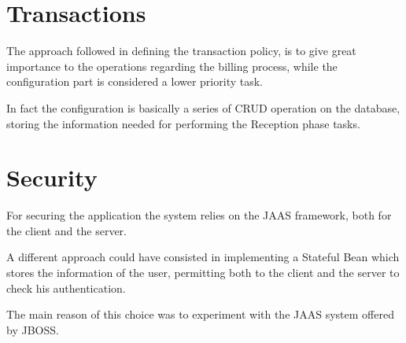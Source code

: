 \documentclass [11pt]{article}
\begin{document}
\section{Transactions}
The approach followed in defining the transaction policy, is to give great
importance to the operations regarding the billing process, while the
configuration part is considered a lower priority task.

In fact the configuration is basically a series of CRUD operation on the
database, storing the information needed for performing the Reception phase tasks.

\section{Security}
For securing the application the system relies on the JAAS framework, both
for the client and the server.

A different approach could have consisted in implementing a Stateful Bean which stores
the information of the user, permitting both to the client and the server
to check his authentication.

The main reason of this choice was to experiment with the JAAS system
offered by JBOSS.
\end{document}
